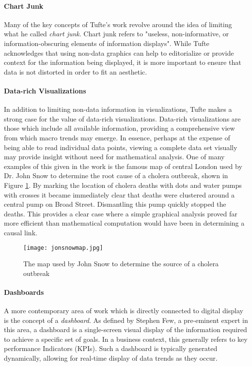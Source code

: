 \paragraph{Chart Junk}
Many of the key concepts of Tufte's work revolve around the idea of limiting what he called \emph{chart junk}. Chart junk refers to "useless, non-informative, or information-obscuring elements of information displays"\cite{Tufle1983}. While Tufte acknowledges that using non-data graphics can help to editorialize or provide context for the information being displayed,  it is more important to ensure that data is not distorted in order to fit an aesthetic. 

\paragraph{Data-rich Visualizations}
In addition to limiting non-data information in visualizations, Tufte makes a strong case for the value of data-rich visualizations. Data-rich visualizations are those which include all available information, providing a comprehensive view from which macro trends may emerge. In essence, perhaps at the expense of being able to read individual data points, viewing a complete data set visually may provide insight without need for mathematical analysis. One of many examples of this given in the work is the famous map of central London used by Dr. John Snow to determine the root cause of a cholera outbreak, shown in Figure \ref{fig:snowmap}. By marking the location of cholera deaths with dots and water pumps with crosses it became immediately clear that deaths were clustered around a central pump on Broad Street. Dismantling this pump quickly stopped the deaths. This provides a clear case where a simple graphical analysis proved far more efficient than mathematical computation would have been in determining a causal link.

\begin{figure}
	\centering
	\label{fig:snowmap}
	\texttt{[image: jonsnowmap.jpg]}
	\caption{The map used by John Snow to determine the source of a cholera outbreak \cite{Tufle1983}}
\end{figure}

\paragraph{Dashboards}
A more contemporary area of work which is directly connected to digital display is the concept of a \emph{dashboard}. As defined by Stephen Few, a pre-eminent expert in this area, a dashboard is a single-screen visual display of the information required to achieve a specific set of goals. In a business context, this generally refers to key performance Indicators (KPIs). Such a dashboard is typically generated dynamically, allowing for real-time display of data trends as they occur. 

